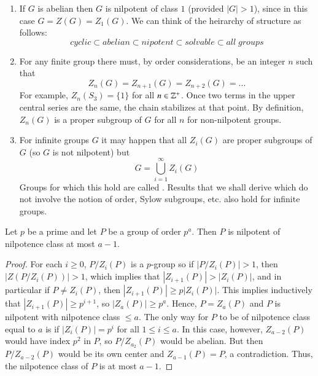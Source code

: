 \documentclass[12pt, a4paper, oneside, openright, titlepage]{book}
\begin{document}
\begin{rmk}
    \leavevmode
    \begin{enumerate}
        \item If $G$ is abelian then $G$ is nilpotent of class $1$ (provided $|G| > 1$), since in this case $G = Z(G) = Z_1(G)$. We can think of the heirarchy of structure as follows: \begin{equation*}
                cyclic\subset abelian \subset nipotent \subset solvable \subset all\;groups
        \end{equation*}
        \item For any finite group there must, by order considerations, be an integer $n$ such that \begin{equation*}
                Z_n(G) = Z_{n+1}(G) = Z_{n+2}(G) = ...
        \end{equation*}
            For example, $Z_n(S_3) = \{1\}$ for all $n \in \mathbb Z^+$. Once two terms in the upper central series  are the same, the chain stabilizes at that point. By definition, $Z_n(G)$ is a proper subgroup of $G$ for all $n$ for non-nilpotent groups.
        \item For infinite groups $G$ it may happen that all $Z_i(G)$ are proper subgroups of $G$ (so $G$ is not nilpotent) but \begin{equation*}
                G = \bigcup\limits_{i=1}^{\infty}Z_i(G)
        \end{equation*}
            Groups for which this hold are called . Results that we shall derive which do not involve the notion of order, Sylow subgroups, etc. also hold for infinite groups.
    \end{enumerate}
\end{rmk}


\begin{prop}
    Let $p$ be a prime and let $P$ be a group of order $p^a$. Then $P$ is nilpotent of nilpotence class at most $a-1$.
\end{prop}
\begin{proof}
    For each $i \geq 0$, $P/Z_i(P)$ is a $p$-group so if $|P/Z_i(P)| > 1$, then $|Z(P/Z_i(P))| > 1$, which implies that $|Z_{i+1}(P)| > |Z_i(P)|$, and in particular if $P \neq Z_i(P)$, then $|Z_{i+1}(P)| \geq p|Z_i(P)|$. This implies inductively that $|Z_{i+1}(P)| \geq p^{i+1}$, so $|Z_a(P)| \geq p^a$. Hence, $P = Z_a(P)$ and $P$ is nilpotent with nilpotence class $\leq a$. The only way for $P$ to be of nilpotence class equal to $a$ is if $|Z_i(P)| = p^i$ for all $1 \leq i \leq a$. In this case, however, $Z_{a-2}(P)$ would have index $p^2$ in $P$, so $P/Z_{a_2}(P)$ would be abelian. But then $P/Z_{a-2}(P)$ would be its own center and $Z_{a-1}(P) = P$, a contradiction. Thus, the nilpotence class of $P$ is at most $a-1$.
\end{proof}
\end{document}
